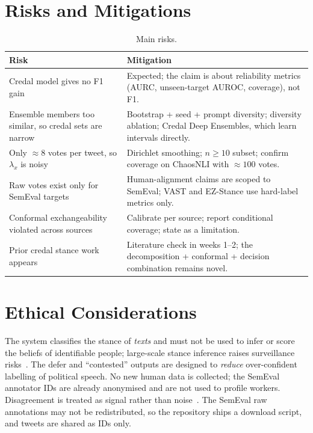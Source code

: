 \documentclass[11pt,a4paper]{article}
\begin{document}
\section{Risks and Mitigations}

\begin{table}[ht]
\centering
\small
\begin{tabular}{p{4.6cm} p{8.6cm}}
\toprule
Risk & Mitigation \\
\midrule
Credal model gives no F1 gain & Expected; the claim is about reliability metrics (AURC, unseen-target AUROC, coverage), not F1. \\
Ensemble members too similar, so credal sets are narrow & Bootstrap + seed + prompt diversity; diversity ablation; Credal Deep Ensembles, which learn intervals directly. \\
Only $\approx 8$ votes per tweet, so $\lambda_x$ is noisy & Dirichlet smoothing; $n \ge 10$ subset; confirm coverage on ChaosNLI with $\approx 100$ votes. \\
Raw votes exist only for SemEval targets & Human-alignment claims are scoped to SemEval; VAST and EZ-Stance use hard-label metrics only. \\
Conformal exchangeability violated across sources & Calibrate per source; report conditional coverage; state as a limitation. \\
Prior credal stance work appears & Literature check in weeks 1--2; the decomposition + conformal + decision combination remains novel. \\
\bottomrule
\end{tabular}
\caption{Main risks.}
\end{table}

\section{Ethical Considerations}

The system classifies the stance of \emph{texts} and must not be used to infer or score the
beliefs of identifiable people; large-scale stance inference raises surveillance
risks~\cite{sici2026}. The defer and ``contested'' outputs are designed to \emph{reduce}
over-confident labelling of political speech. No new human data is collected; the SemEval
annotator IDs are already anonymised and are not used to profile workers. Disagreement is
treated as signal rather than noise~\cite{plank2022,uma2021}. The SemEval raw annotations
may not be redistributed, so the repository ships a download script, and tweets are shared
as IDs only.
\end{document}
